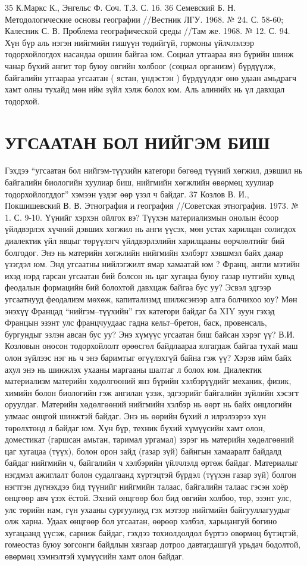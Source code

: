 35 К.Маркс К., Энгельс Ф. Соч. Т.З. С. 16. 36 Семевский Б. Н. Методологические основы географии //Вестник ЛГУ. 1968. № 24. С. 58-60; Калесник С. В. Проблема географической среды //Там же. 1968. № 12. С. 94.
Хүн бүр аль нэгэн нийгмийн гишүүн төдийгүй, гормоны үйлчлэлээр тодорхойлогдох насандаа оршин байгаа юм. Социал утгаараа янз бүрийн шинж чанар бүхий ангит төр буюу овгийн холбоог (социал организм) бүрдүүлж, байгалийн утгаараа угсаатан ( ястан, үндэстэн ) бүрдүүлдэг өнө удаан амьдрагч хамт олны тухайд мөн ийм зүйл хэлж болох юм. Аль алинийх нь үл давхцал тодорхой.
\section{УГСААТАН БОЛ НИЙГЭМ БИШ}
Гэхдээ “угсаатан бол нийгэм-түүхийн категори бөгөөд түүний хөгжил, дэвшил нь байгалийн биологийн хуулиар биш, нийгмийн хөгжлийн өвөрмөц хуулиар тодорхойлогддог” хэмээн үздэг өөр үзэл ч байдаг.
37 Козлов В. И., Покшишевский В. В. Этнография и география //Советская этнография. 1973. № 1. С. 9-10.
Үүнийг хэрхэн ойлгох вэ? Түүхэн материализмын онолын ёсоор үйлдвэрлэх хүчний дэвших хөгжил нь анги үүсэх, мөн устах харилцан солигдох диалектик үйл явцыг төрүүлэгч үйлдвэрлэлийн харилцааны өөрчлөлтийг бий болгодог. Энэ нь материйн хөгжлийн нийгмийн хэлбэрт хэвшмэл байх даяар үзэгдэл юм. Энд угсаатны нийлэгжилт ямар хамаатай юм ? Франц, англи мэтийн ихэд нэрд гарсан угсаатан бий болсон нь цаг хугацаа буюу газар нутгийн хувьд феодалын формацийн бий болохтой давхцаж байгаа бус уу? Эсвэл эдгээр угсаатнууд феодализм мөхөж, капитализмд шилжсэнээр алга болчихоо юу? Мөн энэхүү Францад “нийгэм–түүхийн” гэх категори байдаг ба XIY зуун гэхэд Францын эзэнт улс францчуудаас гадна кельт–бретон, баск, провенсаль, бургундыг эзлэн авсан бус уу? Энэ хүмүүс угсаатан биш байсан хэрэг үү? В.И. Козловын оносон тодорхойлолт өрөөсгөл байдлаараа ялгагдаж байгаа тухай маш олон зүйлээс нэг нь ч энэ баримтыг өгүүлэхгүй байна гэж үү? Хэрэв ийм байх ахул энэ нь шинжлэх ухааны маргааны шалтаг л болох юм.
Диалектик материализм материйн хөдөлгөөний янз бүрийн хэлбэрүүдийг механик, физик, химийн болон биологийн гэж ангилан үзэж, эдгээрийг байгалийн зүйлийн хэсэгт оруулдаг. Материйн хөдөлгөөний нийгмийн хэлбэр нь өөрт нь байх онцлогийн улмаас онцгой шинжтэй байдаг. Энэ нь өөрийн бүхий л илрэлээрээ хүн төрөлхтөнд л байдаг юм. Хүн бүр, техник бүхий хүмүүсийн хамт олон, доместикат (гаршсан амьтан, таримал ургамал) зэрэг нь материйн хөдөлгөөний цаг хугацаа (түүх), болон орон зайд (газар зүй) байнгын хамааралт байдалд байдаг нийгмийн ч, байгалийн ч хэлбэрийн үйлчлэлд өртөж байдаг. Материалыг нэгдмэл ажиглалт болон судалгаанд хүртэцтэй бүрдэл (түүхэн газар зүй) болгон нэгтгэн дүгнэхдээ бид түүнийг нийгмийн талаас, байгалийн талаас гэсэн хоёр өнцгөөр авч үзэх ёстой. Эхний өнцгөөр бол бид овгийн холбоо, төр, эзэнт улс, улс төрийн нам, гүн ухааны сургуулиуд гэх мэтээр нийгмийн байгууллагуудыг олж харна. Удаах өнцгөөр бол угсаатан, өөрөөр хэлбэл, харьцангуй богино хугацаанд үүсэж, сарниж байдаг, гэхдээ тохиолдолдол бүртээ өвөрмөц бүтэцтэй, гомеостаз буюу зогсонги байдлын хязгаар дотроо давтагдашгүй урьдач бодолтой, өвөрмөц хэмнэлтэй хүмүүсийн хамт олон байдаг.

